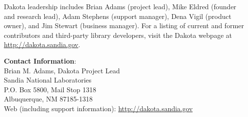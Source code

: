 Dakota leadership includes Brian Adams (project lead), Mike Eldred
(founder and research lead), Adam Stephens (support manager), Dena
Vigil (product owner), and Jim Stewart (business manager).  For a
listing of current and former contributors and third-party library
developers, visit the Dakota webpage at
\url{http://dakota.sandia.gov}.

\textbf{Contact Information}:\\
{\small Brian M. Adams, Dakota Project Lead}\\
{\small Sandia National Laboratories}\\
{\small P.O. Box 5800, Mail Stop 1318}\\
{\small Albuquerque, NM 87185-1318}\\
{\small Web (including support information): \url{http://dakota.sandia.gov}}
